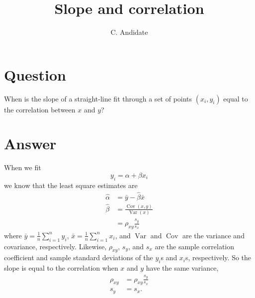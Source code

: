 \documentclass[11pt]{article}
\title{Slope and correlation}
\author{C. Andidate}
\date{}
\begin{document}
\maketitle

\section{Question}
When is the slope of a straight-line fit through a set of points $(x_i,y_i)$ equal to the correlation between $x$ and $y$?

\section{Answer}

When we fit
\[
  y_i = \alpha + \beta x_i
\]
we know that the least square estimates are
\begin{align*}
  \hat{\alpha} &= \bar{y} - \hat\beta \bar{x}  \\
  \hat{\beta} &=
  \frac
  {\operatorname{Cov}(x, y)}
  {\operatorname{Var}(x)} \\
  &= \rho_{xy} \frac{s_y}{s_x}
\end{align*}
where
$  \bar{y} = \frac{1}{n}\sum_{i=1}^{n}{y_i} $,
$  \bar{x} = \frac{1}{n}\sum_{i=1}^{n}{x_i} $,
and $\operatorname{Var}$ and $\operatorname{Cov}$ are the variance and covariance, respectively.
Likewise,
$\rho_{xy}$,
$s_y$, and
$s_x$ are the sample correlation coefficient and sample standard deviations of the $y_i$s and $x_i$s, respectively.
So the slope is equal to the correlation when $x$ and $y$ have the same variance,
\begin{align*}
  \rho_{xy} &= \rho_{xy} \frac{s_y}{s_x} \\
  s_y       &=  s_x
  \text{.}
\end{align*}


%
%
\end{document}
